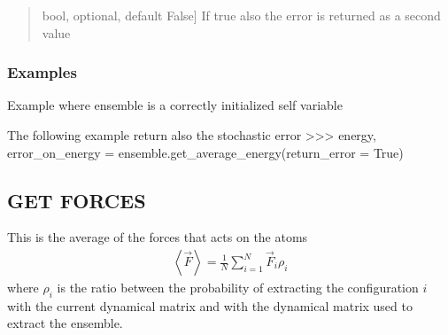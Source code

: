 \documentclass[a4paper,11pt,english]{sphinxmanual}
\begin{document}
\begin{fulllineitems}
\begin{fulllineitems}
\begin{quote}
\begin{description}
\sphinxlineitem{return\_error}{[}bool, optional, default False{]}
\sphinxAtStartPar
If true also the error is returned as a second value

\end{description}
\end{quote}


\subsubsection{Examples}
\label{\detokenize{apireference:examples}}
\sphinxAtStartPar
Example where ensemble is a correctly initialized self variable

\begin{sphinxVerbatim}[commandchars=\\\{\}]
  
\end{sphinxVerbatim}

\sphinxAtStartPar
The following example return also the stochastic error
\textgreater{}\textgreater{}\textgreater{} energy, error\_on\_energy = ensemble.get\_average\_energy(return\_error = True)

\end{fulllineitems}


\begin{fulllineitems}
\label{\detokenize{apireference:sscha.Ensemble.Ensemble.get_average_forces}}
\pysigstartsignatures
{}
\pysigstopsignatures

\subsection{GET FORCES}
\label{\detokenize{apireference:get-forces}}
\sphinxAtStartPar
This is the average of the forces that acts on the atoms
\begin{equation*}
\begin{split}\left< \vec F\right> = \frac{1}{N} \sum_{i = 1}^{N}\vec F_i \rho_i\end{split}
\end{equation*}
\sphinxAtStartPar
where \(\rho_i\) is the ratio between the probability of extracting the configuration \(i\)
with the current dynamical matrix and with the dynamical matrix used to extract the ensemble.



\end{fulllineitems}
\end{fulllineitems}
\end{document}
